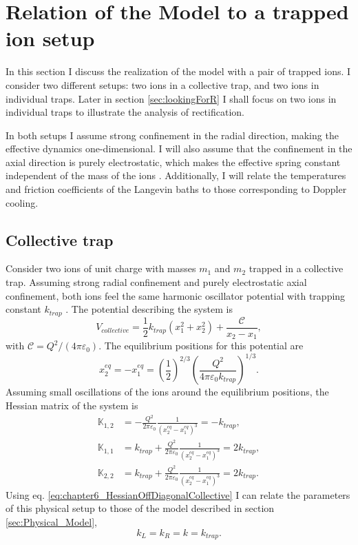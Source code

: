\section{Relation of the Model to a trapped ion setup \label{sec:TrappedIonSetUp}}
%
In this section I discuss the realization of the model with  a pair of trapped ions. I consider two different setups: two ions in a collective trap, and two ions in individual traps. Later in section \ref{sec:lookingForR} I shall focus on two ions in individual traps to illustrate the analysis of rectification.

In both setups I assume strong confinement in the radial direction, making the effective dynamics one-dimensional. I will also assume that the confinement in the axial direction is purely electrostatic, which makes the effective spring constant independent of the mass of the ions \cite{Leibfried2003}. Additionally, I will relate the temperatures and friction coefficients of the Langevin baths to those corresponding to Doppler cooling.
%
%
\subsection{Collective trap}
%
%
Consider two ions of unit charge with masses $m_1$ and $m_2$ trapped in a collective trap. Assuming strong radial confinement and purely electrostatic axial confinement, both ions feel the same harmonic oscillator potential with trapping constant $k_{trap}$ \cite{Leibfried2003}. The potential describing the system is
%
\begin{equation}
  V_{collective} = \frac{1}{2}k_{trap} \left( x_1^2 + x_2^2\right) + \frac{\mathcal{C}}{x_2-x_1},
\end{equation}
%
with $\mathcal{C}={Q^2}/({4\pi\varepsilon_0})$. The equilibrium positions for this potential are
%
\begin{equation}
  x_2^{eq} = -x_1^{eq} =
  \label{eq:chapter6_equilibriumPositionsCollectiveTrap}\left(\frac{1}{2}\right)^{2/3} \left(\frac{Q^2}{4\pi\varepsilon_0 k_{trap}}\right)^{1/3}.
\end{equation}
%
Assuming small oscillations of the ions around the equilibrium positions, the Hessian matrix of the system is
%
\begin{align}
  \mathbb{K}_{1,2} &= -\frac{Q^2}{2\pi\varepsilon_0}\frac{1}{(x_2^{eq}-x_1^{eq})^3} = -k_{trap},\nonumber
  \\
  \mathbb{K}_{1,1} &= k_{trap} + \frac{Q^2}{2\pi\varepsilon_0}\frac{1}{(x_2^{eq}-x_1^{eq})^3} = 2 k_{trap},\nonumber
  \\
  \mathbb{K}_{2,2} &= k_{trap} + \frac{Q^2}{2\pi\varepsilon_0}\frac{1}{(x_2^{eq}-x_1^{eq})^3} = 2 k_{trap}.
  \label{eq:chapter6_HessianOffDiagonalCollective}
\end{align}
%
Using eq. \eqref{eq:chapter6_HessianOffDiagonalCollective} I can relate the parameters of this physical setup to those of the model described in section \ref{sec:Physical_Model},
%
\begin{equation}
  k_L = k_R = k = k_{trap}.
\end{equation}
%
%
%
